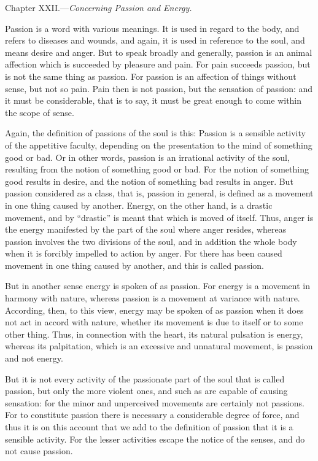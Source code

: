 
Chapter XXII.—\emph{Concerning Passion and Energy.}

Passion is a word with various meanings. It is used in regard to the body, and refers to diseases and wounds, and again, it is used in reference to the soul, and means desire and anger. But to speak broadly and generally, passion is an animal affection which is succeeded by pleasure and pain. For pain succeeds passion, but is not the same thing as passion. For passion is an affection of things without sense, but not so pain. Pain then is not passion, but the sensation of passion: and it must be considerable, that is to say, it must be great enough to come within the scope of sense.

Again, the definition of passions of the soul is this: Passion is a sensible activity of the appetitive faculty, depending on the presentation to the mind of something good or bad. Or in other words, passion is an irrational activity of the soul, resulting from the notion of something good or bad. For the notion of something good results in desire, and the notion of something bad results in anger. But passion considered as a class, that is, passion in general, is defined as a movement in one thing caused by another. Energy, on the other hand, is a drastic movement, and by “drastic” is meant that which is moved of itself. Thus, anger is the energy manifested by the part of the soul where anger resides, whereas passion involves the two divisions of the soul, and in addition the whole body when it is forcibly impelled to action by anger. For there has been caused movement in one thing caused by another, and this is called passion.

But in another sense energy is spoken of as passion. For energy is a movement in harmony with nature, whereas passion is a movement at variance with nature. According, then, to this view, energy may be spoken of as passion when it does not act in accord with nature, whether its movement is due to itself or to some other thing. Thus, in connection with the heart, its natural pulsation is energy, whereas its palpitation, which is an excessive and unnatural movement, is passion and not energy.

But it is not every activity of the passionate part of the soul that is called passion, but only the more violent ones, and such as are capable of causing sensation: for the minor and unperceived movements are certainly not passions. For to constitute passion there is necessary a considerable degree of force, and thus it is on this account that we add to the definition of passion that it is a sensible activity. For the lesser activities escape the notice of the senses, and do not cause passion.

